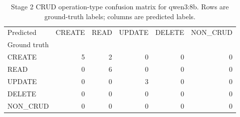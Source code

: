 \begin{table}[htbp]
\caption{Stage 2 CRUD operation-type confusion matrix for qwen3:8b. Rows are ground-truth labels; columns are predicted labels.}
\label{tab:stage2_confusion_qwen3_8b}
\begin{tabular}{lrrrrr}
\toprule
Predicted & CREATE & READ & UPDATE & DELETE & NON_CRUD \\
Ground truth &  &  &  &  &  \\
\midrule
CREATE & 5 & 2 & 0 & 0 & 0 \\
READ & 0 & 6 & 0 & 0 & 0 \\
UPDATE & 0 & 0 & 3 & 0 & 0 \\
DELETE & 0 & 0 & 0 & 0 & 0 \\
NON_CRUD & 0 & 0 & 0 & 0 & 0 \\
\bottomrule
\end{tabular}
\end{table}
